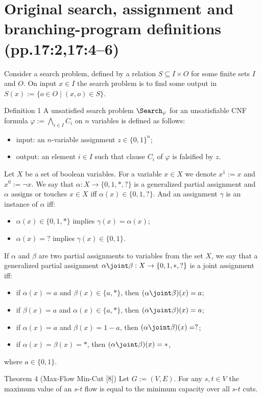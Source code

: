 \section*{Original search, assignment and branching-program definitions (pp.17:2,17:4--6)}
Consider a search problem, defined by a relation $S\subseteq I\times O$ for some finite sets $I$ and $O$. On input $x\in I$ the search problem is to find some output in $S(x):=\{o\in O\mid(x,o)\in S\}$.
\begin{result}{Definition 1}
A unsatisfied search problem $\Search_\varphi$ for an unsatisfiable CNF formula $\varphi:=\bigwedge_{i\in I}C_i$ on $n$ variables is defined as follows:
\begin{itemize}\item input: an $n$-variable assignment $z\in\{0,1\}^n$;
\item output: an element $i\in I$ such that clause $C_i$ of $\varphi$ is falsified by $z$.\end{itemize}
\end{result}
Let $X$ be a set of boolean variables. For a variable $x\in X$ we denote $x^1:=x$ and $x^0:=\neg x$.
We say that $\alpha:X\to\{0,1,*,?\}$ is a generalized partial assignment and $\alpha$ assigns or touches $x\in X$ iff $\alpha(x)\in\{0,1,?\}$. And an assignment $\gamma$ is an instance of $\alpha$ iff:
\begin{itemize}\item $\alpha(x)\in\{0,1,*\}$ implies $\gamma(x)=\alpha(x)$;
\item $\alpha(x)=?$ implies $\gamma(x)\in\{0,1\}$.\end{itemize}
If $\alpha$ and $\beta$ are two partial assignments to variables from the set $X$, we say that a generalized partial assignment $\alpha\joint\beta:X\to\{0,1,*,?\}$ is a joint assignment iff:
\begin{itemize}\item if $\alpha(x)=a$ and $\beta(x)\in\{a,*\}$, then $(\alpha\joint\beta)(x)=a$;
\item if $\beta(x)=a$ and $\alpha(x)\in\{a,*\}$, then $(\alpha\joint\beta)(x)=a$;
\item if $\alpha(x)=a$ and $\beta(x)=1-a$, then $(\alpha\joint\beta)(x)=?$;
\item if $\alpha(x)=\beta(x)=*$, then $(\alpha\joint\beta)(x)=*$,
\end{itemize}
where $a\in\{0,1\}$.
\begin{result}{Theorem 4 (Max-Flow Min-Cut [8])}
Let $G:=(V,E)$. For any $s,t\in V$ the maximum value of an $s$-$t$ flow is equal to the minimum capacity over all $s$-$t$ cuts.
\end{result}
